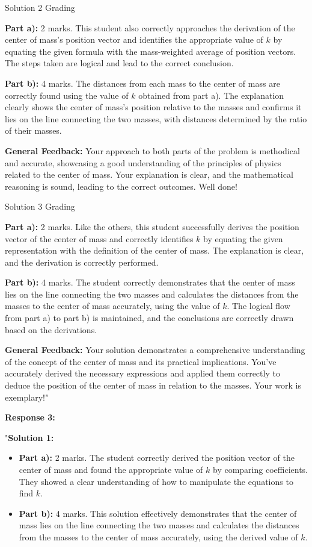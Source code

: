 \documentclass[a4paper,11pt]{article}
\begin{document}
Solution 2 Grading

\textbf{Part a):} 2 marks. This student also correctly approaches the derivation of the center of mass's position vector and identifies the appropriate value of \( k \) by equating the given formula with the mass-weighted average of position vectors. The steps taken are logical and lead to the correct conclusion.

\textbf{Part b):} 4 marks. The distances from each mass to the center of mass are correctly found using the value of \( k \) obtained from part a). The explanation clearly shows the center of mass's position relative to the masses and confirms it lies on the line connecting the two masses, with distances determined by the ratio of their masses.

\textbf{General Feedback:} Your approach to both parts of the problem is methodical and accurate, showcasing a good understanding of the principles of physics related to the center of mass. Your explanation is clear, and the mathematical reasoning is sound, leading to the correct outcomes. Well done!

Solution 3 Grading

\textbf{Part a):} 2 marks. Like the others, this student successfully derives the position vector of the center of mass and correctly identifies \( k \) by equating the given representation with the definition of the center of mass. The explanation is clear, and the derivation is correctly performed.

\textbf{Part b):} 4 marks. The student correctly demonstrates that the center of mass lies on the line connecting the two masses and calculates the distances from the masses to the center of mass accurately, using the value of \( k \). The logical flow from part a) to part b) is maintained, and the conclusions are correctly drawn based on the derivations.

\textbf{General Feedback:} Your solution demonstrates a comprehensive understanding of the concept of the center of mass and its practical implications. You've accurately derived the necessary expressions and applied them correctly to deduce the position of the center of mass in relation to the masses. Your work is exemplary!"

\textbf{Response 3:}

"\textbf{Solution 1:}

\begin{itemize}
    \item \textbf{Part a):} 2 marks. The student correctly derived the position vector of the center of mass and found the appropriate value of \( k \) by comparing coefficients. They showed a clear understanding of how to manipulate the equations to find \( k \).
    \item \textbf{Part b):} 4 marks. This solution effectively demonstrates that the center of mass lies on the line connecting the two masses and calculates the distances from the masses to the center of mass accurately, using the derived value of \( k \).
\end{itemize}
\end{document}
